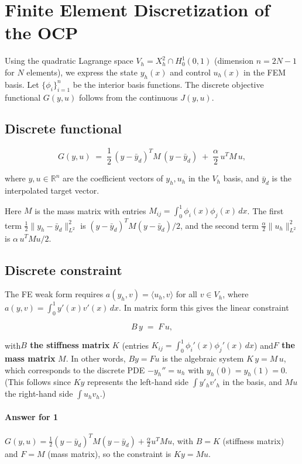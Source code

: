 \documentclass[a4paper,10pt]{report}
\begin{document}
\section{Finite Element Discretization of the OCP}
Using the quadratic Lagrange space \(V_h = X_h^2 \cap H^1_0(0,1)\) (dimension \(n=2N-1\) for \(N\) elements), we express the state \(y_h(x)\) and control \(u_h(x)\) in the FEM basis.
Let \(\{\phi_i\}_{i=1}^n\) be the interior basis functions. The discrete objective functional \(G(y,u)\) follows from the continuous \(J(y,u)\).

\subsection{Discrete functional}

\[
	G(y,u) \;=\; \frac{1}{2}\,(y - \bar y_d)^T M\, (y - \bar y_d)\;+\;\frac{\alpha}{2}\,u^T M\,u,
\]

where \(y, u \in \mathbb{R}^n\) are the coefficient vectors of \(y_h, u_h\) in the \(V_h\) basis, and \(\bar y_d\) is the interpolated target vector.

Here \(M\) is the mass matrix with entries \(M_{ij}=\int_0^1 \phi_i(x)\phi_j(x)\,dx\). The first term \(\frac{1}{2}\|y_h - \bar y_d\|_{L^2}^2\) is \((y-\bar y_d)^T M (y-\bar y_d)/2\), and the second term \(\frac{\alpha}{2}\|u_h\|_{L^2}^2\) is \(\alpha\,u^T M u/2\).

\subsection{Discrete constraint}

The FE weak form requires \(a(y_h,v) = \langle u_h,v\rangle\) for all \(v\in V_h\), where \(a(y,v)=\int_0^1 y'(x)v'(x)\,dx\). In matrix form this gives the linear constraint

\[
	B\,y \;=\; F\,u,
\]

with\textbf{\(B\) the stiffness matrix} \(K\) (entries \(K_{ij}=\int_0^1 \phi_i'(x)\phi_j'(x)\,dx\)) and\textbf{\(F\) the mass matrix} \(M\).  In other words, \(By=Fu\) is the algebraic system \(K\,y = M\,u\), which corresponds to the discrete PDE \(-y_h''=u_h\) with \(y_h(0)=y_h(1)=0\). (This follows since \(K y\) represents the left-hand side \(\int y'_h v'_h\) in the basis, and \(M u\) the right-hand side \(\int u_h v_h\).)

\paragraph{Answer for 1}
\(G(y,u)=\frac12 (y-\bar y_d)^T M (y-\bar y_d) + \frac{\alpha}{2} u^T M u\), with \(B=K\) (stiffness matrix) and \(F=M\) (mass matrix), so the constraint is \(K y = M u\).
\end{document}
